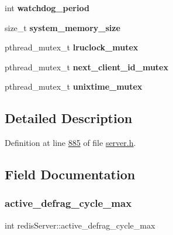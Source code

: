 \begin{DoxyCompactItemize}
\mbox{\label{structredisServer_af66e35b25a5ca0c1239eea8671336de9}} 
int {\bfseries watchdog\+\_\+period}
\item 
\mbox{\label{structredisServer_a36ff3c22e12565d894e9a536c859a0e3}} 
size\+\_\+t {\bfseries system\+\_\+memory\+\_\+size}
\item 
\mbox{\label{structredisServer_a1ce4627ac237fda78fc784a99921a971}} 
pthread\+\_\+mutex\+\_\+t {\bfseries lruclock\+\_\+mutex}
\item 
\mbox{\label{structredisServer_a0ef4857fd7df45d2c64ec3b1774482f8}} 
pthread\+\_\+mutex\+\_\+t {\bfseries next\+\_\+client\+\_\+id\+\_\+mutex}
\item 
\mbox{\label{structredisServer_a6bd730986b47de7c45cb9f7c35ee7d16}} 
pthread\+\_\+mutex\+\_\+t {\bfseries unixtime\+\_\+mutex}
\end{DoxyCompactItemize}


\subsection{Detailed Description}


Definition at line \hyperlink{server_8h_source_l00885}{885} of file \hyperlink{server_8h_source}{server.\+h}.



\subsection{Field Documentation}
\mbox{\label{structredisServer_a53642caebe502ffe1e87e74856e9de9c}} 
\subsubsection{\texorpdfstring{active\+\_\+defrag\+\_\+cycle\+\_\+max}{active\_defrag\_cycle\_max}}
{\footnotesize\ttfamily int redis\+Server\+::active\+\_\+defrag\+\_\+cycle\+\_\+max}



